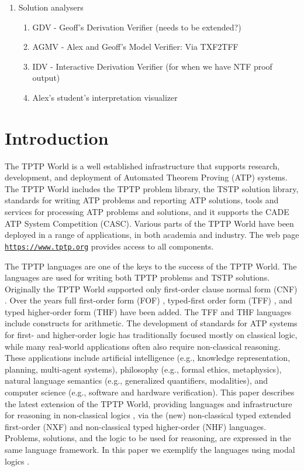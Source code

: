 \documentclass[runningheads]{llncs}
\begin{document}
\begin{enumerate}
\item Solution analysers
      \begin{enumerate}
      \item GDV - Geoff's Derivation Verifier (needs to be extended?)
      \item AGMV - Alex and Geoff's Model Verifier: Via TXF2TFF
      \item IDV - Interactive Derivation Verifier (for when we have NTF proof output)
      \item Alex's student's interpretation visualizer
      \end{enumerate}

\end{enumerate}
\section{Introduction}
\label{Introduction}

The TPTP World \cite{Sut17} is a well established infrastructure that supports research, 
development, and deployment of Automated Theorem Proving (ATP) systems.
The TPTP World includes the TPTP problem library,
the TSTP solution library,
standards for writing ATP problems and reporting ATP solutions,
tools and services for processing ATP problems and solutions,
and it supports the CADE ATP System Competition (CASC).
Various parts of the TPTP World have been deployed in a range of applications,
in both academia and industry.
The web page \href{https://www.tptp.org}{\tt https://www.tptp.org} provides access to all 
components.

The TPTP languages \cite{Sut22-IGPL} are one of the keys to the success of the TPTP World.
The languages are used for writing both TPTP problems and TSTP solutions.
Originally the TPTP World supported only first-order clause normal form (CNF) \cite{SS98-JAR}.
Over the years full first-order form (FOF) \cite{Sut09}, typed-first order form (TFF) 
\cite{SS+12,BP13-TFF1}, and typed higher-order form (THF) \cite{SB10,KSR16} have been added.
The TFF and THF languages include constructs for arithmetic.
The development of standards for ATP systems for first- and higher-order logic has traditionally 
focused mostly on classical logic, while many real-world applications often also require 
non-classical reasoning. 
These applications include artificial intelligence (e.g., knowledge representation, planning, 
multi-agent systems), philosophy (e.g., formal ethics, metaphysics), natural language semantics 
(e.g., generalized quantifiers, modalities), and computer science (e.g., software and hardware 
verification).
This paper describes the latest extension of the TPTP World, providing languages and
infrastructure for reasoning in non-classical logics \cite{Pri08,Gob01}, via the (new)
non-classical typed extended first-order (NXF) and non-classical typed higher-order (NHF) 
languages.
Problems, solutions, and the logic to be used for reasoning, are expressed in the same language 
framework.
In this paper we exemplify the languages using modal logics \cite{BBW06}.
\end{document}
